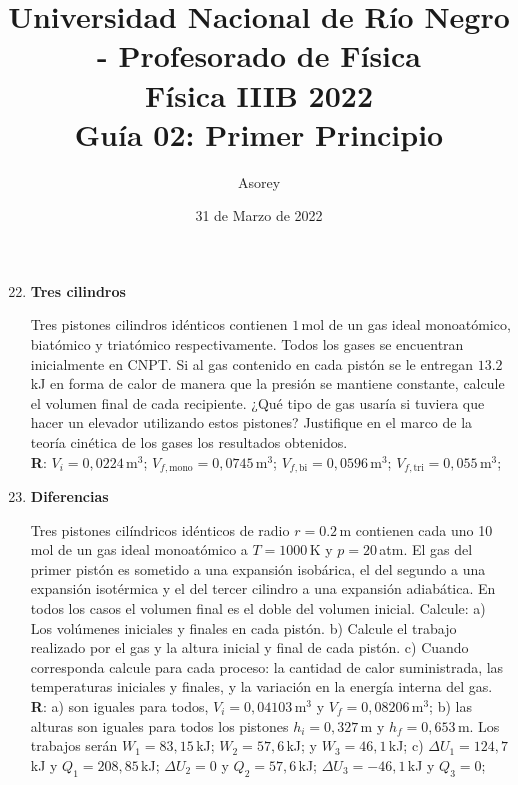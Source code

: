 \documentclass[a4paper,12pt]{article}
\begin{document}
\title{
{\normalsize{Universidad Nacional de Río Negro - Profesorado de Física}}\\
Física IIIB 2022 \\ Guía 02: Primer Principio
}
\author{Asorey}
\date{31 de Marzo de 2022}
\maketitle

\begin{enumerate}
	\setcounter{enumi}{21}      %

    \item {\bf{Tres cilindros}}

        Tres pistones cilindros idénticos contienen $1$\,mol de un gas ideal 
        monoatómico, biatómico y triatómico respectivamente. Todos los gases se
        encuentran inicialmente en CNPT. Si al gas contenido en cada pistón se
        le entregan $13.2$\,kJ en forma de calor de manera que la presión se
        mantiene constante, calcule el volumen final de cada recipiente.
        ¿Qué tipo de gas usaría si tuviera que hacer un elevador utilizando 
        estos pistones? Justifique en el marco de la teoría cinética de los
        gases los resultados obtenidos.
		\\{\bf{R}}: $V_i=0,0224$\,m$^3$; $V_{f,\mathrm{mono}}=0,0745$\,m$^3$;
		$V_{f,\mathrm{bi}}=0,0596$\,m$^3$; $V_{f,\mathrm{tri}}=0,055$\,m$^3$;

	\item {\bf{Diferencias}}
		
		Tres pistones cilíndricos idénticos de radio $r=0.2$\,m contienen cada
		uno 10\,mol de un gas ideal monoatómico a $T=1000$\,K y $p=20$\,atm.
		El gas del primer pistón es sometido a una expansión isobárica, el del
		segundo a una expansión isotérmica y el del tercer cilindro a una
		expansión adiabática. En todos los casos el volumen final es el doble
		del volumen inicial. Calcule: a) Los volúmenes iniciales y finales en
		cada pistón. b) Calcule el trabajo realizado por el gas y la altura
		inicial y final de cada pistón. c) Cuando corresponda calcule para cada
		proceso: la cantidad de calor suministrada, las temperaturas iniciales
		y finales, y la variación en la energía interna del gas.
		\\{\bf{R}}: a) son iguales para todos, $V_i=0,04103$\,m$^3$ y
		$V_{f}=0,08206$\,m$^3$; b) las alturas son iguales para todos los
		pistones $h_i=0,327$\,m y $h_f=0,653$\,m. Los trabajos serán
		$W_1=83,15$\,kJ; $W_2=57,6$\,kJ; y $W_3=46,1$\,kJ; c) $\Delta
		U_1=124,7$\,kJ y $Q_1=208,85$\,kJ; $\Delta U_2=0$ y $Q_2=57,6$\,kJ;
		$\Delta U_3=-46,1$\,kJ y $Q_3=0$;  
	

\end{enumerate}
\end{document}
